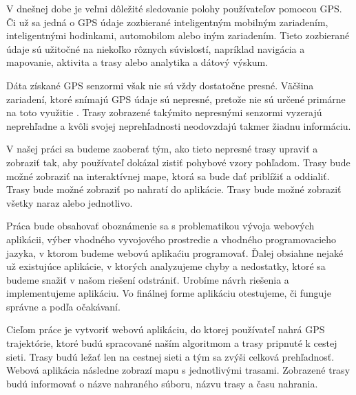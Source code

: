 V dnešnej dobe je veľmi dôležité sledovanie polohy používateľov pomocou GPS. Či už sa jedná o GPS údaje zozbierané inteligentným mobilným zariadením, inteligentnými hodinkami, automobilom alebo iným zariadením. Tieto zozbierané údaje sú užitočné na niekoľko rôznych súvislostí, napríklad navigácia a mapovanie, aktivita a trasy alebo analytika a dátový výskum. 


Dáta získané GPS senzormi však nie sú vždy dostatočne presné. Väčšina zariadení, ktoré snímajú GPS údaje sú nepresné, pretože nie sú určené primárne na toto využitie \cite{993780}. Trasy zobrazené takýmito nepresnými senzormi vyzerajú neprehľadne a kvôli svojej neprehľadnosti neodovzdajú takmer žiadnu informáciu. 

V našej práci sa budeme zaoberať tým, ako tieto nepresné trasy upraviť a zobraziť tak, aby používateľ dokázal zistiť pohybové vzory pohľadom. Trasy bude možné zobraziť na interaktívnej mape, ktorá sa bude dať priblížiť a oddialiť. Trasy bude možné zobraziť po nahratí do aplikácie. Trasy bude možné zobraziť všetky naraz alebo jednotlivo.

Práca bude obsahovať oboznámenie sa s problematikou vývoja webových aplikácii, výber vhodného vyvojového prostredie a vhodného programovacieho jazyka, v ktorom budeme webovú aplikaćiu programovať. Ďalej obsiahne nejaké už existujúce aplikácie, v ktorých analyzujeme chyby a nedostatky, ktoré sa budeme snažiť v našom riešení odstrániť. Urobíme návrh riešenia a implementujeme aplikáciu. Vo finálnej forme aplikáciu otestujeme, či funguje správne a podľa očakávaní.

Cieľom práce je vytvoriť webovú aplikáciu, do ktorej používateľ nahrá GPS trajektórie, ktoré budú spracované naším algoritmom a trasy pripnuté k cestej sieti. Trasy budú ležať len na cestnej sieti a tým sa zvýši celková prehľadnosť. Webová aplikácia následne zobrazí mapu s jednotlivými trasami. Zobrazené trasy budú informovať o názve nahraného súboru, názvu trasy a času nahrania.
